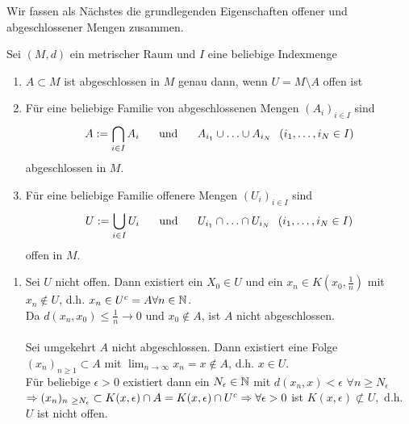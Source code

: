 Wir fassen als Nächstes die grundlegenden Eigenschaften offener und abgeschlossener Mengen zusammen.

\begin{prop}
	Sei $(M, d)$ ein metrischer Raum und $I$ eine beliebige Indexmenge
	\begin{enumerate}[label=\alph*\upshape)]
		\item $A \subset M$ ist abgeschlossen in $M$ genau dann, wenn $U = M \setminus A$ offen ist
		\item Für eine beliebige Familie von abgeschlossenen Mengen $(A_{i})_{i \in I}$ sind 
			\[ A := \bigcap_{i \in I} A_{i} \hspace{0.5cm} \text{ und } \hspace{0.5cm} A_{i_{1}} \cup \dotsc \cup A_{i_{N}} \hspace{0.25cm} (i_{1}, \dotsc, i_{N} \in I) \]
			abgeschlossen in $M$.
		\item Für eine beliebige Familie offenere Mengen $(U_{i})_{i \in I}$ sind
			\[ U := \bigcup_{i \in I} U_{i} \hspace{0.5cm} \text{ und } \hspace{0.5cm} U_{i_{1}} \cap \dotsc \cap U_{i_{N}} \hspace{0.25cm} (i_{1}, \dotsc, i_{N} \in I) \] 
			offen in $M$.
	\end{enumerate}
	\begin{beweis}
		\begin{enumerate}[label=\alph*\upshape)]
			\item Sei $U$ nicht offen. Dann existiert ein $X_{0} \in U$ und  ein $x_{n} \in K(x_{0}, \frac{1}{n})$ mit $x_{n} \notin U$, d.h. $x_{n} \in U^{c} = A \forall n \in \mathbb{N}$. \\
				Da $d(x_{n}, x_{0}) \leq \frac{1}{n} \rightarrow 0$ und $x_{0} \notin A$, ist $A$ nicht abgeschlossen. \\ \\
				Sei umgekehrt $A$ nicht abgeschlossen. Dann existiert eine Folge $(x_{n})_{n \geq 1} \subset A$ mit $\lim_{n \rightarrow \infty} x_{n} = x \notin A$, d.h. $x \in U$. \\
				Für beliebige $\epsilon > 0$ existiert dann ein $N_{\epsilon} \in \mathbb{N}$ mit $d(x_{n}, x) < \epsilon$  $\forall n \geq N_{\epsilon}$ \\	
				$\Rightarrow (x_{n})_{n \geq N_{\epsilon}} \subset K(x, \epsilon) \cap A = K(x, \epsilon) \cap U^{c} \\
				\Rightarrow \forall \epsilon > 0 $ ist $ K(x, \epsilon) \not\subset U, $ d.h. $U$ ist nicht offen.

\end{enumerate}
\end{beweis}
\end{prop}
